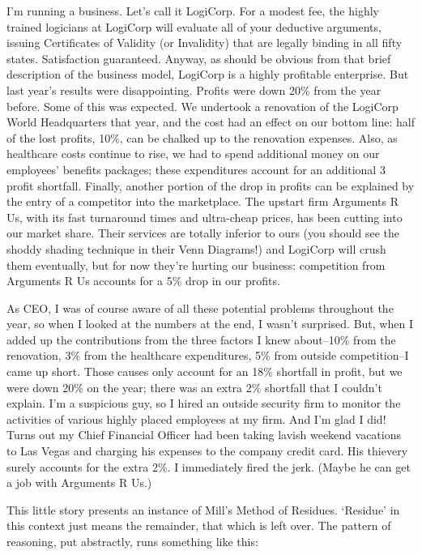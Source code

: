 I'm running a business. Let's call it LogiCorp. For a modest fee, the highly trained logicians at
LogiCorp will evaluate all of your deductive arguments, issuing Certificates of Validity (or
Invalidity) that are legally binding in all fifty states. Satisfaction guaranteed. Anyway, as should
be obvious from that brief description of the business model, LogiCorp is a highly profitable
enterprise. But last year's results were disappointing. Profits were down 20\% 
from the year before.
Some of this was expected. We undertook a renovation of the LogiCorp World Headquarters that
year, and the cost had an effect on our bottom line: half of the lost profits, 10\%, 
can be chalked up
to the renovation expenses. Also, as healthcare costs continue to rise, we had to spend additional
money on our employees' benefits packages; these expenditures account for an additional 3%
profit shortfall. Finally, another portion of the drop in profits can be explained by the entry of a
competitor into the marketplace. The upstart firm Arguments R Us, with its fast turnaround times
and ultra-cheap prices, has been cutting into our market share. Their services are totally inferior to
ours (you should see the shoddy shading technique in their Venn Diagrams!) and LogiCorp will
crush them eventually, but for now they're hurting our business: competition from Arguments R
Us accounts for a 5\% 
drop in our profits.

As CEO, I was of course aware of all these potential problems throughout the year, so when I
looked at the numbers at the end, I wasn't surprised. But, when I added up the contributions from
the three factors I knew about--10\% 
from the renovation, 3\% 
from the healthcare expenditures, 5\% 
from outside competition--I came up short. Those causes only account for an 18\% 
shortfall
in profit, but we were down 20\% 
on the year; there was an extra 2\% 
shortfall that I couldn't explain.
I'm a suspicious guy, so I hired an outside security firm to monitor the activities of various highly
placed employees at my firm. And I'm glad I did! Turns out my Chief Financial Officer had been
taking lavish weekend vacations to Las Vegas and charging his expenses to the company credit
card. His thievery surely accounts for the extra 2\%. 
I immediately fired the jerk. (Maybe he can
get a job with Arguments R Us.)

This little story presents an instance of Mill's Method of Residues. `Residue' in this context just
means the remainder, that which is left over. The pattern of reasoning, put abstractly, runs
something like this:

